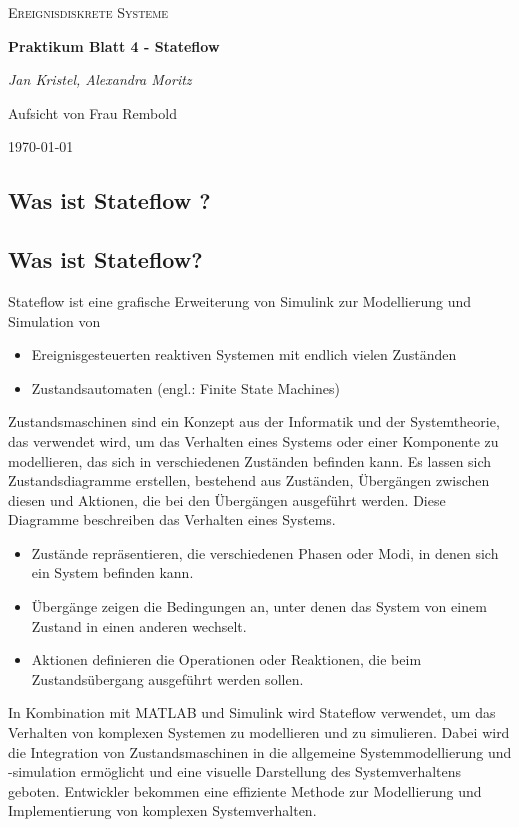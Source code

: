 \documentclass{article}
\begin{document}
		\begin{titlepage}
		\centering
		{\scshape\LARGE
			Ereignisdiskrete Systeme
			\par}
		\vspace{1.5cm}
		{\huge\bfseries Praktikum Blatt 4 - Stateflow\par}
		\vspace{1.5cm}
		{\LARGE\itshape Jan Kristel, Alexandra Moritz\par}
		\vfill
			Aufsicht von Frau Rembold\par
			
		\vfill	
			{\large \today \par}	
		
	\end{titlepage}
	
	\tableofcontents
	\clearpage
\newpage
	\begin{multicols}{2}
	\section{Was ist \textbf{Stateflow} ?}
		\renewcommand{\thesubsection}{\alph{subsection})}
		\subsection{Was ist Stateflow?}
			Stateflow ist eine grafische Erweiterung von Simulink zur Modellierung und Simulation von
			\begin{itemize}
				\item Ereignisgesteuerten reaktiven Systemen mit endlich vielen Zuständen
				\item Zustandsautomaten (engl.: Finite State Machines)
			\end{itemize}
			Zustandsmaschinen sind ein Konzept aus der Informatik und der Systemtheorie, das verwendet wird, um das Verhalten eines Systems oder einer Komponente zu modellieren, das sich in verschiedenen Zuständen befinden kann.
			Es lassen sich Zustandsdiagramme erstellen, bestehend aus Zuständen, Übergängen zwischen diesen und Aktionen, die bei den Übergängen ausgeführt werden. Diese Diagramme beschreiben das Verhalten eines Systems. 
			\begin{itemize}
				\item Zustände repräsentieren, die verschiedenen Phasen oder Modi, in denen sich ein System befinden kann.
				\item Übergänge zeigen die Bedingungen an, unter denen das System von einem Zustand in einen anderen wechselt. 
				\item Aktionen definieren die Operationen oder Reaktionen, die beim Zustandsübergang ausgeführt werden sollen.
			\end{itemize} 
			In Kombination mit MATLAB und Simulink wird Stateflow verwendet, um das Verhalten von komplexen Systemen zu modellieren und zu simulieren.
			 Dabei wird die Integration von Zustandsmaschinen in die allgemeine Systemmodellierung und -simulation ermöglicht und eine visuelle Darstellung des Systemverhaltens geboten.
			Entwickler bekommen eine effiziente Methode zur Modellierung und Implementierung von komplexen Systemverhalten.

\end{multicols}
\end{document}
